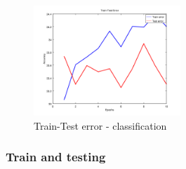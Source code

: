 \begin{figure}[h]
	\begin{center}
		\includegraphics[width=209px,height=157px]{src/img/system-design/train-test-classif}
		\caption{Train-Test error - classification} \label{fig:100tt}
    \end{center}
\end{figure}

\subsubsection{Train and testing}
\newpage



